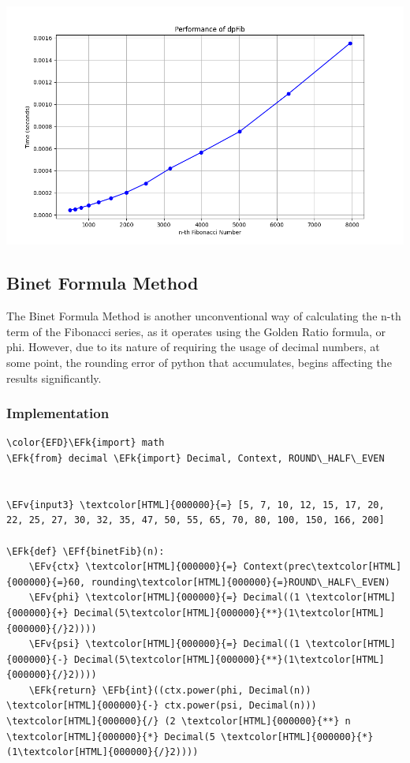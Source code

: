 \documentclass[a4paper,12pt]{article}
\newcommand{\EFk}[1]{\textcolor{EFk}{#1}} %
\newcommand{\EFb}[1]{\textcolor{EFb}{#1}} %
\newcommand{\EFf}[1]{\textcolor{EFf}{#1}} %
\newcommand{\EFv}[1]{\textcolor{EFv}{#1}} %
\begin{document}
\begin{center}
\includegraphics[width=.9\linewidth]{dinamicFib.png}
\label{orgac49d83}
\end{center}
\subsection{Binet Formula Method}
\label{sec:org537de3c}
The Binet Formula Method is another unconventional way of calculating the n-th term of the
Fibonacci series, as it operates using the Golden Ratio formula, or phi. However, due to its nature of
requiring the usage of decimal numbers, at some point, the rounding error of python that accumulates,
begins affecting the results significantly.
\subsubsection{Implementation}
\label{sec:org74a911b}
\begin{Code}
\begin{Verbatim}
\color{EFD}\EFk{import} math
\EFk{from} decimal \EFk{import} Decimal, Context, ROUND\_HALF\_EVEN


\EFv{input3} \textcolor[HTML]{000000}{=} [5, 7, 10, 12, 15, 17, 20, 22, 25, 27, 30, 32, 35, 47, 50, 55, 65, 70, 80, 100, 150, 166, 200]

\EFk{def} \EFf{binetFib}(n):
    \EFv{ctx} \textcolor[HTML]{000000}{=} Context(prec\textcolor[HTML]{000000}{=}60, rounding\textcolor[HTML]{000000}{=}ROUND\_HALF\_EVEN)
    \EFv{phi} \textcolor[HTML]{000000}{=} Decimal((1 \textcolor[HTML]{000000}{+} Decimal(5\textcolor[HTML]{000000}{**}(1\textcolor[HTML]{000000}{/}2))))
    \EFv{psi} \textcolor[HTML]{000000}{=} Decimal((1 \textcolor[HTML]{000000}{-} Decimal(5\textcolor[HTML]{000000}{**}(1\textcolor[HTML]{000000}{/}2))))
    \EFk{return} \EFb{int}((ctx.power(phi, Decimal(n)) \textcolor[HTML]{000000}{-} ctx.power(psi, Decimal(n))) \textcolor[HTML]{000000}{/} (2 \textcolor[HTML]{000000}{**} n \textcolor[HTML]{000000}{*} Decimal(5 \textcolor[HTML]{000000}{*} (1\textcolor[HTML]{000000}{/}2))))
\end{Verbatim}
\end{Code}
\end{document}
